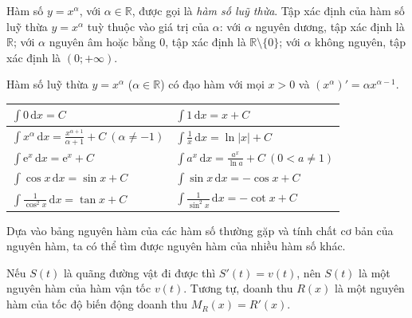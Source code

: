 \begin{kienthuc}
Hàm số $y=x^\alpha$, với $\alpha\in\mathbb R$, được gọi là \emph{hàm số luỹ thừa}. Tập xác định của hàm số luỹ thừa $y=x^\alpha$ tuỳ thuộc vào giá trị của $\alpha$: với $\alpha$ nguyên dương, tập xác định là $\mathbb R$; với $\alpha$ nguyên âm hoặc bằng $0$, tập xác định là $\mathbb R\setminus\{0\}$; với $\alpha$ không nguyên, tập xác định là $(0;+\infty)$.

Hàm số luỹ thừa $y=x^\alpha$ ($\alpha\in\mathbb R$) có đạo hàm với mọi $x>0$ và $\left(x^\alpha\right)'=\alpha x^{\alpha-1}$.
\end{kienthuc}

\begin{congthuc}
\begin{center}{\renewcommand\arraystretch{2.1}
\begin{tabular}{|>{\centering\arraybackslash}p{.44\linewidth}|>{\centering\arraybackslash}p{.44\linewidth}|}\hline
$\displaystyle\int0\,\mathrm dx=C$ & $\displaystyle\int1\,\mathrm dx=x+C$\\\hline
$\displaystyle\int x^\alpha\,\mathrm dx=\frac{x^{\alpha+1}}{\alpha+1}+C\ (\alpha\ne-1)$ & $\displaystyle\int\frac1x\,\mathrm dx=\ln|x|+C$\\\hline
$\displaystyle\int\mathrm e^x\,\mathrm dx=\mathrm e^x+C$ & $\displaystyle\int a^x\,\mathrm dx=\frac{a^x}{\ln a}+C\ (0<a\ne1)$\\\hline
$\displaystyle\int\cos x\,\mathrm dx=\sin x+C$ & $\displaystyle\int\sin x\,\mathrm dx=-\cos x+C$\\\hline
$\displaystyle\int\frac{1}{\cos^2x}\,\mathrm dx=\tan x+C$ & $\displaystyle\int\frac{1}{\sin^2x}\,\mathrm dx=-\cot x+C$\\\hline
\end{tabular}}\end{center}
Dựa vào bảng nguyên hàm của các hàm số thường gặp và tính chất cơ bản của nguyên hàm, ta có thể tìm được nguyên hàm của nhiều hàm số khác.
\end{congthuc}

\begin{nhanxet}
Nếu $S(t)$ là quãng đường vật đi được thì $S'(t)=v(t)$, nên $S(t)$ là một nguyên hàm của hàm vận tốc $v(t)$. Tương tự, doanh thu $R(x)$ là một nguyên hàm của tốc độ biến động doanh thu $M_R(x)=R'(x)$.
\end{nhanxet}

\viduminhhoa
